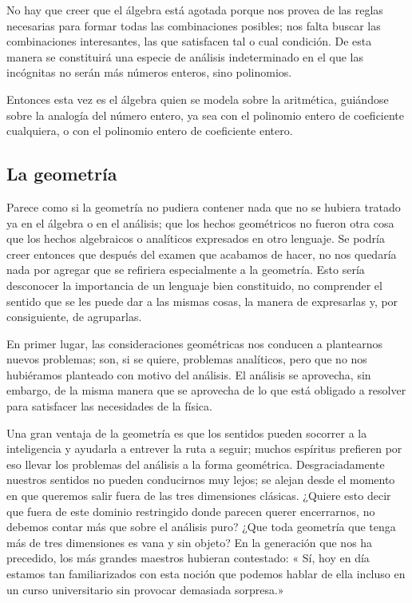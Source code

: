 \documentclass[a4paper, 12pt]{article}
\begin{document}
No hay que creer que el álgebra está agotada porque nos provea de
las reglas necesarias para formar todas las combinaciones posibles; nos
falta buscar las combinaciones interesantes, las que satisfacen tal o cual
condición. De esta manera se constituirá una especie de análisis
indeterminado en el que las incógnitas no serán más números
enteros, sino polinomios.

Entonces esta vez es el álgebra quien se modela sobre la aritmética,
guiándose sobre la analogía del número entero, ya sea con el
polinomio entero de coeficiente cualquiera, o con el polinomio entero de
coeficiente entero.

\subsection*{La geometría}


Parece como si la geometría no pudiera contener nada que no se
hubiera tratado ya en el álgebra o en el análisis; que los hechos
geométricos no fueron otra cosa que los hechos algebraicos o analíticos expresados en otro lenguaje. Se podría creer entonces que después del examen que acabamos de hacer, no nos quedaría nada por agregar que se refiriera especialmente
a la geometría. Esto sería desconocer la importancia de un lenguaje bien constituido,
no comprender el sentido que se les puede dar a las mismas cosas, la manera
de expresarlas y, por consiguiente, de agruparlas.


En primer lugar, las consideraciones geométricas nos conducen a
plantearnos nuevos problemas; son, si se quiere, problemas analíticos,
pero que no nos hubiéramos planteado con motivo del análisis. El análisis se aprovecha, sin embargo, de la misma manera que se aprovecha de
lo que está obligado a resolver para satisfacer las necesidades de la física.



Una gran ventaja de la geometría es que los sentidos pueden socorrer a
la inteligencia y ayudarla a entrever la ruta a seguir; muchos espíritus prefieren por eso llevar los problemas del análisis a la forma geométrica. Desgraciadamente nuestros sentidos no pueden conducirnos muy
lejos; se alejan desde el momento en que queremos salir fuera de las tres
dimensiones clásicas. ¿Quiere esto decir que fuera de este dominio
restringido donde parecen querer encerrarnos, no debemos contar más que
sobre el análisis puro? ¿Que toda geometría que tenga más de
tres dimensiones es vana y sin objeto? En la generación que nos ha
precedido, los más grandes maestros hubieran contestado: «
Sí, hoy en día estamos tan familiarizados con esta noción que
podemos hablar de ella incluso en un curso universitario sin provocar
demasiada sorpresa.» 
\end{document}
